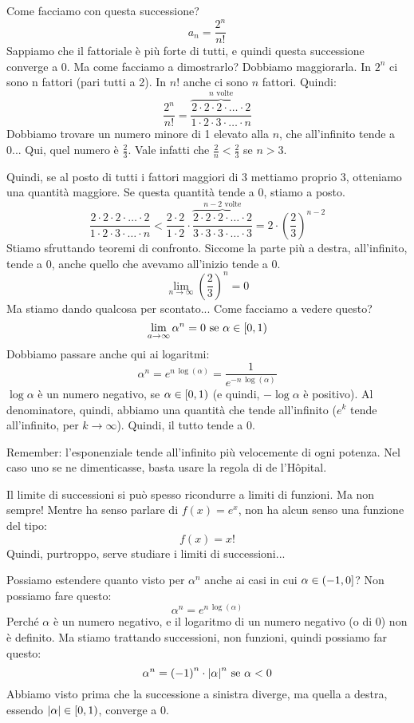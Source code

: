 Come facciamo con questa successione?
\[
a_n = \frac{2^n}{n!}
\]
Sappiamo che il fattoriale \`e pi\`u forte di tutti, e quindi questa successione converge a 0. Ma come facciamo a dimostrarlo? Dobbiamo maggiorarla. In $2^n$ ci sono n fattori (pari tutti a 2). In $n!$ anche ci sono $n$ fattori. Quindi:
\[
\frac{2^n}{n!} = \overbrace{\frac{2 \cdot 2 \cdot 2 \cdot \ldots \cdot 2}{1 \cdot 2 \cdot 3 \cdot \ldots \cdot n}}^{n \text{ volte}}
\]
Dobbiamo trovare un numero minore di 1 elevato alla $n$, che all'infinito tende a 0... Qui, quel numero \`e $\frac{2}{3}$. Vale infatti che $\frac{2}{n} < \frac{2}{3}$ se $n > 3$.

Quindi, se al posto di tutti i fattori maggiori di 3 mettiamo proprio 3, otteniamo una quantit\`a maggiore. Se questa quantit\`a tende a 0, stiamo a posto.
\[
\frac{2 \cdot 2 \cdot 2 \cdot \ldots \cdot 2}{1 \cdot 2 \cdot 3 \cdot \ldots \cdot n} < \frac{2 \cdot 2}{1 \cdot 2} \cdot \overbrace{\frac{2 \cdot 2 \cdot 2 \cdot \ldots \cdot 2}{3 \cdot 3 \cdot 3 \cdot \ldots \cdot 3}}^{n-2 \text{ volte}} =
2 \cdot {\left( \frac{2}{3} \right)}^{n-2}
\]
Stiamo sfruttando teoremi di confronto. Siccome la parte pi\`u a destra, all'infinito, tende a 0, anche quello che avevamo all'inizio tende a 0.
\[
\lim_{n \to \infty} {\left( \frac{2}{3} \right)}^{n} = 0
\]
Ma stiamo dando qualcosa per scontato... Come facciamo a vedere questo?
\[
\lim_{a \to \infty} \alpha^n = 0 \text{ se } \alpha \in \left[ {0}, {1} \right)
\]
Dobbiamo passare anche qui ai logaritmi:
\[
\alpha^n = e^{n \, \log (\alpha)} = \frac{1}{e^{-n \, \log(\alpha)}}
\]
$\log{\alpha}$ \`e un numero negativo, se $\alpha \in \left[ {0}, {1} \right)$ (e quindi, $- \log{\alpha}$ \`e positivo). Al denominatore, quindi, abbiamo una quantit\`a che tende all'infinito ($e^k$ tende all'infinito, per $k \to \infty$). Quindi, il tutto tende a 0.

Remember: l'esponenziale tende all'infinito pi\`u velocemente di ogni potenza. Nel caso uno se ne dimenticasse, basta usare la regola di de l'H\^{o}pital.

Il limite di successioni si pu\`o spesso ricondurre a limiti di funzioni. Ma non sempre! Mentre ha senso parlare di $f(x) = e^x$, non ha alcun senso una funzione del tipo:
\[
f(x) = x!
\]
Quindi, purtroppo, serve studiare i limiti di successioni...

Possiamo estendere quanto visto per $\alpha^n$ anche ai casi in cui $\alpha \in \left( {-1}, {0} \right]$? Non possiamo fare questo:
\[
\alpha^n = e^{n \, \log(\alpha)}
\]
Perch\'e $\alpha$ \`e un numero negativo, e il logaritmo di un numero negativo (o di 0) non \`e definito. Ma stiamo trattando successioni, non funzioni, quindi possiamo far questo:
\[
\alpha^n = {\left( -1 \right)}^n \cdot {\left\lvert{\alpha}\right\rvert}^n \text{ se } \alpha < 0
\]
Abbiamo visto prima che la successione a sinistra diverge, ma quella a destra, essendo $\left\lvert{\alpha}\right\rvert \in \left[ {0}, {1} \right)$, converge a 0. 

